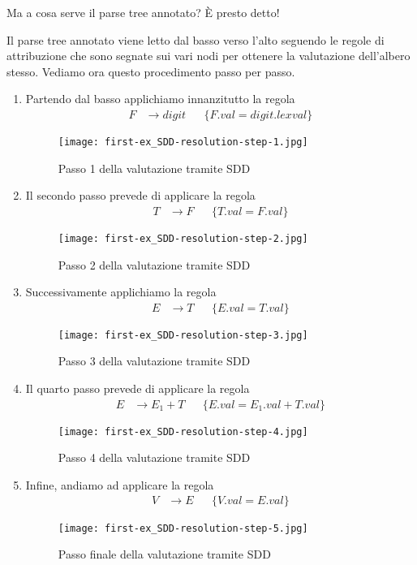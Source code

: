 \documentclass[class=book, crop=false, oneside, 12pt]{standalone}
\begin{document}
Ma a cosa serve il parse tree annotato? È presto detto!

\noindent Il parse tree annotato viene letto dal basso verso l'alto seguendo le regole di attribuzione che sono segnate sui vari nodi per ottenere la valutazione dell'albero stesso. Vediamo ora questo procedimento passo per passo.

\begin{enumerate}
    \item Partendo dal basso applichiamo innanzitutto la regola
    \begin{align*}
        F &\to digit & &\{F.val = digit.lexval\}
    \end{align*}
    \begin{figure}[H]
        \centering
        \texttt{[image: first-ex\_SDD-resolution-step-1.jpg]}
        \caption{Passo 1 della valutazione tramite SDD}
    \end{figure}
    \item Il secondo passo prevede di applicare la regola
    \begin{align*}
        T &\to F & &\{T.val = F.val\}
    \end{align*}
    \begin{figure}[H]
        \centering
        \texttt{[image: first-ex\_SDD-resolution-step-2.jpg]}
        \caption{Passo 2 della valutazione tramite SDD}
    \end{figure}
    \item Successivamente applichiamo la regola
    \begin{align*}
        E &\to T & &\{E.val = T.val\}
    \end{align*}
    \begin{figure}[H]
        \centering
        \texttt{[image: first-ex\_SDD-resolution-step-3.jpg]}
        \caption{Passo 3 della valutazione tramite SDD}
    \end{figure}
    \item Il quarto passo prevede di applicare la regola
    \begin{align*}
        E &\to E_1 + T & &\{E.val = E_1.val + T.val\}
    \end{align*}
    \begin{figure}[H]
        \centering
        \texttt{[image: first-ex\_SDD-resolution-step-4.jpg]}
        \caption{Passo 4 della valutazione tramite SDD}
    \end{figure}
    \item Infine, andiamo ad applicare la regola
    \begin{align*}
        V &\to E & &\{V.val = E.val\}
    \end{align*}
    \begin{figure}[H]
        \centering
        \texttt{[image: first-ex\_SDD-resolution-step-5.jpg]}
        \caption{Passo finale della valutazione tramite SDD}
    \end{figure}
\end{enumerate}
\end{document}
